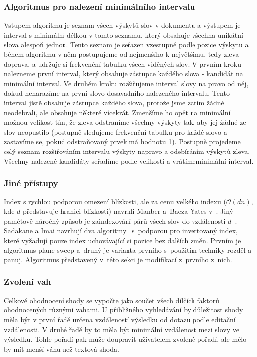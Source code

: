 \documentclass[11pt,letterpaper,oneside,openright]{book}
\begin{document}
\subsubsection{Algoritmus pro nalezení minimálního intervalu}
Vstupem algoritmu je seznam všech výskytů slov v dokumentu a výstupem je
interval s minimální délkou v tomto seznamu, který obsahuje všechna unikátní
slova alespoň jednou. Tento seznam je seřazen vzestupně podle pozice výskytu a
během algoritmu v něm postupujeme od nejmenšího k největšímu, tedy zleva
doprava, a udržuje si frekvenční tabulku všech viděných slov.  V prvním kroku
nalezneme první interval, který obsahuje zástupce každého slova - kandidát na
minimální interval. Ve druhém kroku rozšiřujeme interval slovy na pravo od něj,
dokud nenarazíme na první slovo dosavadního nalezeného intervalu. Tento
interval jistě obsahuje zástupce každého slova, protože jsme zatím žádné
neodebrali, ale obsahuje některé vícekrát. Zmenšíme ho opět na minimální možnou
velikost tím, že zleva odstraníme všechny výskyty tak, aby jej žádné ze slov
neopustilo (postupně sledujeme frekvenční tabulku pro každé slovo a zastavíme
se, pokud odstraňovaný prvek má hodnotu 1). Postupně projedeme celý seznam
rozšiřováním intervalu výskyty napravo a odebíráním výskytů zleva. Všechny
nalezené kandidáty seřadíme podle velikosti a vrátímeminimální interval.

\subsubsection{Jiné přístupy}
Index s rychlou podporou omezení blízkosti, ale za cenu velkého indexu
($\mathcal{O}(dn)$, kde $d$ představuje hranici blízkosti) navrhli Manber
a~Baeza-Yates v~\cite{MANBER1991133}. Jiný paměťově náročný způsob je
zaindexování párů všech slov do vzdálenosti $d$~\cite{Aref95}. Sadakane a Imai
navrhují dva algoritmy~\cite{Sadakane99textretrieval} s~podporou pro
invertovaný index, které vyžadují pouze index uchovávající si pozice bez
dalších změn. Prvním je algoritmus plane-sweep a~druhý je varianta prvního
s~použitím techniky rozděl a panuj. Algoritmus představený v~této sekci je
modifikací z~prvního z~nich.

\subsubsection{Zvolení vah}
Celkové ohodnocení shody se vypočte jako součet všech dílčích faktorů
ohodnocených různými vahami. U přibližného vyhledávání by důležitost shody měla
být v první řadě určena vzdáleností výsledku od dotazu podle editační
vzdálenosti. V druhé řadě by to měla být minimální vzdálenost mezi slovy ve
výsledku. Tohle pořadí pak může doupravit uživatelem zvolené pořadí, ale mělo
by mít menší váhu než textová shoda.
\end{document}
